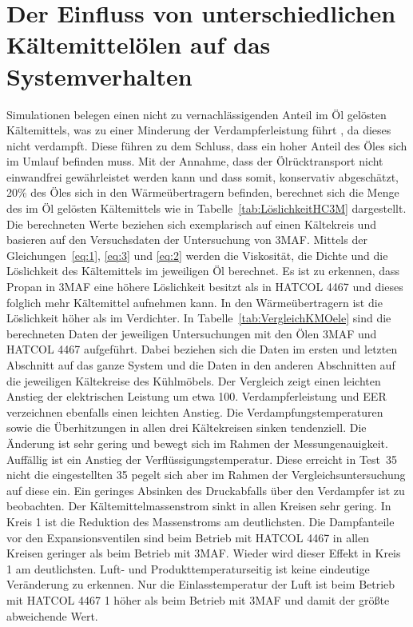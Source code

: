 \clearpage









\section{Der Einfluss von unterschiedlichen Kältemittelölen auf das Systemverhalten}
\label{sec:EinflussÖl}

Simulationen belegen einen nicht zu vernachlässigenden Anteil im Öl gelösten Kältemittels, was zu einer Minderung der Verdampferleistung führt \cite{Universitatpolitecnicadevalencia.2017}, da dieses nicht verdampft. Diese führen zu dem Schluss, dass ein hoher Anteil des Öles sich im Umlauf befinden muss. Mit der Annahme, dass der Ölrücktransport nicht einwandfrei gewährleistet werden kann und dass somit, konservativ abgeschätzt, \unit{20}{\%} des Öles sich in den Wärmeübertragern befinden, berechnet sich die Menge des im Öl gelösten Kältemittels wie in Tabelle~\ref{tab:LöslichkeitHC3M} dargestellt.
Die berechneten Werte beziehen sich exemplarisch auf einen Kältekreis und basieren auf den Versuchsdaten der Untersuchung von 3MAF.
Mittels der Gleichungen~\ref{eq:1}, \ref{eq:3} und \ref{eq:2} werden die Viskosität, die Dichte und die Löslichkeit des Kältemittels im jeweiligen Öl berechnet. Es ist zu erkennen, dass Propan in 3MAF eine höhere Löslichkeit besitzt als in HATCOL 4467 und dieses folglich mehr Kältemittel aufnehmen kann. In den Wärmeübertragern ist die Löslichkeit höher als im Verdichter.
In Tabelle~\ref{tab:VergleichKMOele} sind die berechneten Daten der jeweiligen Untersuchungen mit den Ölen 3MAF und HATCOL 4467 aufgeführt. Dabei beziehen sich die Daten im ersten und letzten Abschnitt auf das ganze System und die Daten in den anderen Abschnitten auf die jeweiligen Kältekreise des Kühlmöbels.
Der Vergleich zeigt einen leichten Anstieg der elektrischen Leistung um etwa \unit{100}{\watt}. Verdampferleistung und EER verzeichnen ebenfalls einen leichten Anstieg. Die Verdampfungstemperaturen sowie die Überhitzungen in allen drei Kältekreisen sinken tendenziell. Die Änderung ist sehr gering und bewegt sich im Rahmen der Messungenauigkeit. Auffällig ist ein Anstieg der Verflüssigungstemperatur. Diese erreicht in Test~35 nicht die eingestellten \unit{35}{\celsius} pegelt sich aber im Rahmen der Vergleichsuntersuchung auf diese ein. Ein geringes Absinken des Druckabfalls über den Verdampfer ist zu beobachten. Der Kältemittelmassenstrom sinkt in allen Kreisen sehr gering. In Kreis 1 ist die Reduktion des Massenstroms am deutlichsten. Die Dampfanteile vor den Expansionsventilen sind beim Betrieb mit HATCOL 4467 in allen Kreisen geringer als beim Betrieb mit 3MAF. Wieder wird dieser Effekt in Kreis 1 am deutlichsten. 
Luft- und Produkttemperaturseitig ist keine eindeutige Veränderung zu erkennen. 
Nur die Einlasstemperatur der Luft ist beim Betrieb mit HATCOL 4467 \unit{1}{\kelvin} höher als beim Betrieb mit 3MAF und damit der größte abweichende Wert. 

